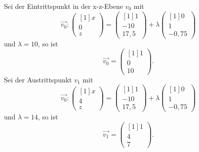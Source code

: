 Sei der Eintrittspunkt in der x-z-Ebene $\displaystyle v_{0}$ mit
\begin{equation*}
	\overrightarrow{v_{0}} :\begin{pmatrix}[1]
		x\\
		0\\
		z
	\end{pmatrix} =\begin{pmatrix}[1]
		1\\
		-10\\
		17,5
	\end{pmatrix} +\lambda \begin{pmatrix}[1]
		0\\
		1\\
		-0,75
	\end{pmatrix}
\end{equation*}
und $\displaystyle \lambda =10$, so ist
\begin{equation*}
	\overrightarrow{v_{0}} =\begin{pmatrix}[1]
		1\\
		0\\
		10
	\end{pmatrix}\text{.}
\end{equation*}
Sei der Austrittspunkt $\displaystyle v_{1}$ mit
\begin{equation*}
	\overrightarrow{v_{0}} :\begin{pmatrix}[1]
		x\\
		4\\
		z
	\end{pmatrix} =\begin{pmatrix}[1]
		1\\
		-10\\
		17,5
	\end{pmatrix} +\lambda \begin{pmatrix}[1]
		0\\
		1\\
		-0,75
	\end{pmatrix}
\end{equation*}
und $\displaystyle \lambda =14$, so ist
\begin{equation*}
	\overrightarrow{v_{1}} =\begin{pmatrix}[1]
		1\\
		4\\
		7
	\end{pmatrix}\text{.}
\end{equation*}


